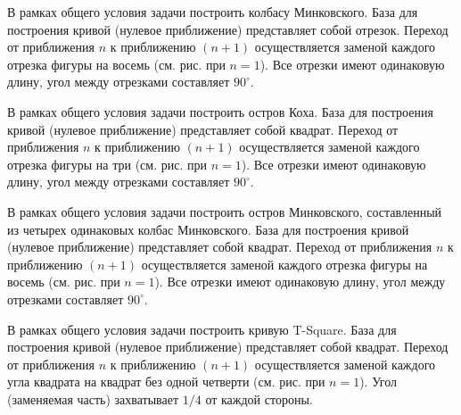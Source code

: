 
\begin{zztask}
В рамках общего условия задачи построить колбасу Минковского.
База для построения кривой (нулевое приближение) представляет собой отрезок.
Переход от приближения $n$ к приближению $(n+1)$ осуществляется заменой каждого 
отрезка фигуры на восемь (см. рис. при $n=1$). 
Все отрезки имеют одинаковую длину, угол между отрезками составляет $90^\circ$.
\par
\end{zztask}


\begin{zztask}
В рамках общего условия задачи построить остров Коха. База для построения кривой 
(нулевое приближение) представляет собой квадрат.
Переход от приближения $n$ к приближению $(n+1)$ осуществляется заменой каждого 
отрезка фигуры на три (см. рис. при $n=1$). 
Все отрезки имеют одинаковую длину, угол между отрезками составляет $90^\circ$.
\par
\end{zztask}


\begin{zztask}
В рамках общего условия задачи построить остров Минковского, составленный из
четырех одинаковых колбас Минковского. База для построения кривой 
(нулевое приближение) представляет собой квадрат.
Переход от приближения $n$ к приближению $(n+1)$ осуществляется заменой каждого 
отрезка фигуры на восемь (см. рис. при $n=1$). 
Все отрезки имеют одинаковую длину, угол между отрезками составляет $90^\circ$.
\par
\end{zztask}


\begin{zztask}
В рамках общего условия задачи построить кривую T-Square.
База для построения кривой (нулевое приближение) представляет собой квадрат.
Переход от приближения $n$ к приближению $(n+1)$ осуществляется заменой каждого 
угла квадрата на квадрат без одной четверти (см. рис. при $n=1$). 
Угол (заменяемая часть) захватывает $1/4$ от каждой стороны.
\par
\end{zztask}

